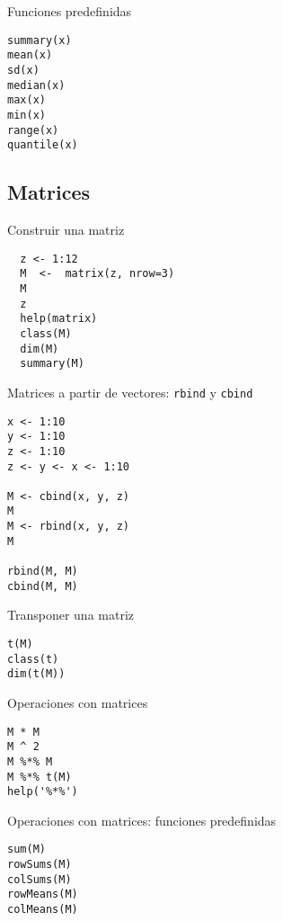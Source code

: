 \documentclass[xcolor={usenames,svgnames,dvipsnames}]{beamer}
\begin{document}
\begin{frame}[fragile,label=sec-2-1-15]{Funciones predefinidas}
 \lstset{language=R,label= ,caption= ,numbers=none}
\begin{lstlisting}
summary(x)
mean(x)
sd(x)
median(x)
max(x)
min(x)
range(x)
quantile(x)
\end{lstlisting}
\end{frame}



\subsection{Matrices}
\label{sec-2-2}
\begin{frame}[fragile,label=sec-2-2-1]{Construir una matriz}
 \lstset{language=R,label= ,caption= ,numbers=none}
\begin{lstlisting}
  z <- 1:12
  M  <-  matrix(z, nrow=3)
  M
  z
  help(matrix)
  class(M)
  dim(M)
  summary(M)
\end{lstlisting}
\end{frame}

\begin{frame}[fragile,label=sec-2-2-2]{Matrices a partir de vectores: \texttt{rbind} y \texttt{cbind}}
 \lstset{language=R,label= ,caption= ,numbers=none}
\begin{lstlisting}
x <- 1:10
y <- 1:10
z <- 1:10
z <- y <- x <- 1:10

M <- cbind(x, y, z)
M
M <- rbind(x, y, z)
M

rbind(M, M)
cbind(M, M)
\end{lstlisting}
\end{frame}

\begin{frame}[fragile,label=sec-2-2-3]{Transponer una matriz}
 \lstset{language=R,label= ,caption= ,numbers=none}
\begin{lstlisting}
t(M)
class(t)
dim(t(M))
\end{lstlisting}
\end{frame}

\begin{frame}[fragile,label=sec-2-2-4]{Operaciones con matrices}
 \lstset{language=R,label= ,caption= ,numbers=none}
\begin{lstlisting}
M * M
M ^ 2
M %*% M
M %*% t(M)
help('%*%')
\end{lstlisting}
\end{frame}

\begin{frame}[fragile,label=sec-2-2-5]{Operaciones con matrices: funciones predefinidas}
 \lstset{language=R,label= ,caption= ,numbers=none}
\begin{lstlisting}
sum(M)
rowSums(M)
colSums(M)
rowMeans(M)
colMeans(M)
\end{lstlisting}
\end{frame}
\end{document}
